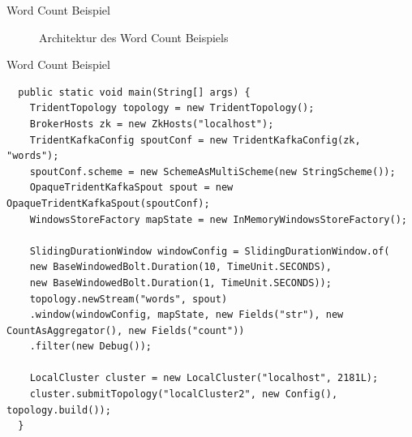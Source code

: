 \documentclass{beamer}
\begin{document}
\begin{frame}[t]{Word Count Beispiel}
  \begin{figure}[h]
    \center
    \scalebox{.7}{}
    \caption{Architektur des Word Count Beispiels}
    \label{fig:wordcountsamplearchitecture}
  \end{figure}
\end{frame}

\begin{frame}[fragile]{Word Count Beispiel}
  \begin{lstlisting}
  public static void main(String[] args) {
    TridentTopology topology = new TridentTopology();
    BrokerHosts zk = new ZkHosts("localhost");
    TridentKafkaConfig spoutConf = new TridentKafkaConfig(zk, "words");
    spoutConf.scheme = new SchemeAsMultiScheme(new StringScheme());
    OpaqueTridentKafkaSpout spout = new OpaqueTridentKafkaSpout(spoutConf);
    WindowsStoreFactory mapState = new InMemoryWindowsStoreFactory();

    SlidingDurationWindow windowConfig = SlidingDurationWindow.of(
    new BaseWindowedBolt.Duration(10, TimeUnit.SECONDS),
    new BaseWindowedBolt.Duration(1, TimeUnit.SECONDS));
    topology.newStream("words", spout)
    .window(windowConfig, mapState, new Fields("str"), new CountAsAggregator(), new Fields("count"))
    .filter(new Debug());

    LocalCluster cluster = new LocalCluster("localhost", 2181L);
    cluster.submitTopology("localCluster2", new Config(), topology.build());
  }
  \end{lstlisting}
\end{frame}
\end{document}
